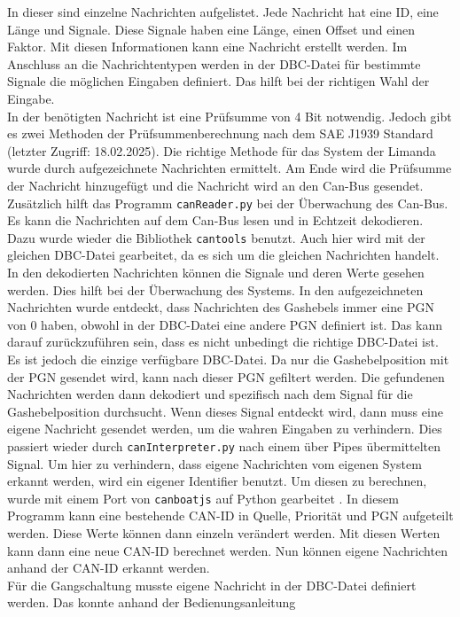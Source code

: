 In dieser sind einzelne Nachrichten aufgelistet. Jede Nachricht hat eine ID, eine Länge und Signale. Diese Signale
haben eine Länge, einen Offset und einen Faktor. Mit diesen Informationen kann eine Nachricht erstellt werden.
Im Anschluss an die Nachrichtentypen werden in der DBC-Datei für bestimmte Signale die möglichen Eingaben definiert.
Das hilft bei der richtigen Wahl der Eingabe. \\
In der benötigten Nachricht ist eine Prüfsumme von 4 Bit notwendig. Jedoch gibt es zwei Methoden der Prüfsummenberechnung
nach dem SAE J1939 Standard \cite{VectorSAE} (letzter Zugriff: 18.02.2025). Die richtige Methode für das System der 
Limanda wurde durch aufgezeichnete Nachrichten ermittelt. Am Ende wird die Prüfsumme der Nachricht hinzugefügt und die
Nachricht wird an den Can-Bus gesendet. \\
Zusätzlich hilft das Programm \texttt{canReader.py} bei der Überwachung des Can-Bus. Es kann die Nachrichten auf dem
Can-Bus lesen und in Echtzeit dekodieren. Dazu wurde wieder die Bibliothek \texttt{cantools} benutzt. Auch hier wird
mit der gleichen DBC-Datei gearbeitet, da es sich um die gleichen Nachrichten handelt. In den dekodierten Nachrichten
können die Signale und deren Werte gesehen werden. Dies hilft bei der Überwachung des Systems. 
In den aufgezeichneten Nachrichten wurde entdeckt, dass Nachrichten des Gashebels
immer eine PGN von 0 haben, obwohl in der DBC-Datei eine andere PGN definiert ist. Das kann darauf zurückzuführen sein, dass
es nicht unbedingt die richtige DBC-Datei ist. Es ist jedoch die einzige verfügbare DBC-Datei. Da nur die Gashebelposition
mit der PGN gesendet wird, kann nach dieser PGN gefiltert werden. Die gefundenen Nachrichten werden dann dekodiert und
spezifisch nach
dem Signal für die Gashebelposition durchsucht. 
Wenn dieses Signal entdeckt wird, dann muss eine eigene Nachricht
gesendet werden, um die wahren Eingaben zu verhindern. Dies passiert wieder durch \texttt{canInterpreter.py} nach 
einem über Pipes übermittelten Signal. Um hier zu verhindern, dass eigene Nachrichten vom eigenen System erkannt werden,
wird ein eigener Identifier benutzt. Um diesen zu berechnen, wurde mit einem Port von \texttt{canboatjs} auf Python gearbeitet 
\cite{canboatjs}. 
In diesem Programm kann eine bestehende CAN-ID in Quelle, Priorität und PGN aufgeteilt werden. Diese Werte können dann
einzeln verändert werden. Mit diesen Werten kann dann eine neue CAN-ID berechnet werden. Nun können eigene Nachrichten 
anhand der CAN-ID erkannt werden.\\
Für die Gangschaltung musste eigene Nachricht in der DBC-Datei definiert werden. Das konnte anhand der Bedienungsanleitung
